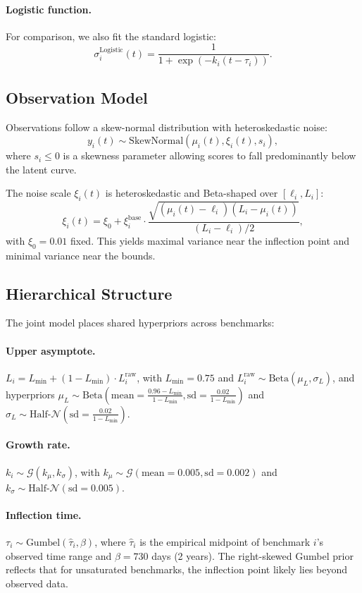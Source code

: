 \documentclass[letterpaper,twocolumn]{article}
\begin{document}
\paragraph{Logistic function.} For comparison, we also fit the standard logistic:
$$\sigma_i^{\text{Logistic}}(t) = \frac{1}{1 + \exp(-k_i(t - \tau_i))}.$$

\subsection{Observation Model}

Observations follow a skew-normal distribution with heteroskedastic noise:
$$y_i(t) \sim \text{SkewNormal}(\mu_i(t), \xi_i(t), s_i),$$
where $s_i \leq 0$ is a skewness parameter allowing scores to fall predominantly below the latent curve.

The noise scale $\xi_i(t)$ is heteroskedastic and Beta-shaped over $[\ell_i, L_i]$:
$$\xi_i(t) = \xi_0 + \xi_i^{\text{base}} \cdot \frac{\sqrt{(\mu_i(t) - \ell_i)(L_i - \mu_i(t))}}{(L_i - \ell_i)/2},$$
with $\xi_0 = 0.01$ fixed. This yields maximal variance near the inflection point and minimal variance near the bounds.

\subsection{Hierarchical Structure}

The joint model places shared hyperpriors across benchmarks:

\paragraph{Upper asymptote.} $L_i = L_{\min} + (1 - L_{\min}) \cdot L_i^{\text{raw}}$, with $L_{\min} = 0.75$ and $L_i^{\text{raw}} \sim \text{Beta}(\mu_L, \sigma_L)$, and hyperpriors $\mu_L \sim \text{Beta}\left(\text{mean} = \frac{0.96 - L_\text{min}}{1 - L_\text{min}}, \text{sd} = \frac{0.02}{1 - L_\text{min}}\right)$ and $\sigma_L \sim \text{Half-}\mathcal N\left(\text{sd}=\frac{0.02}{1 - L_\text{min}}\right)$.

\paragraph{Growth rate.} $k_i \sim \mathcal G(k_{\mu}, k_{\sigma})$, with $k_{\mu} \sim \mathcal G(\text{mean}=0.005, \text{sd}=0.002)$ and $k_{\sigma} \sim \text{Half-}\mathcal N(\text{sd}=0.005)$.

\paragraph{Inflection time.} $\tau_i \sim \text{Gumbel}(\hat{\tau}_i, \beta)$, where $\hat{\tau}_i$ is the empirical midpoint of benchmark $i$'s observed time range and $\beta = 730$ days (2 years). The right-skewed Gumbel prior reflects that for unsaturated benchmarks, the inflection point likely lies beyond observed data.
\end{document}
